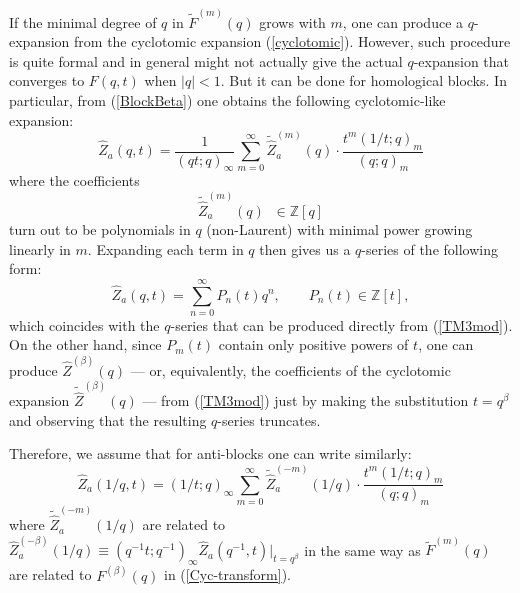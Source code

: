 \documentclass[hyper,letterpaper]{JHEP3}
\newcommand{\Z}{{\mathbb Z}}
\def\tilde{\widetilde}
\renewcommand{\hat}{\widehat}
\begin{document}
If the minimal degree of $q$ in $\tilde{F}^{(m)}(q)$ grows with $m$, one can produce a $q$-expansion from the cyclotomic expansion (\ref{cyclotomic}). However, such procedure is quite formal and in general might not actually give the actual $q$-expansion that converges to $F(q,t)$ when $|q|<1$. But it can be done for homological blocks. In particular, from (\ref{BlockBeta}) one obtains the following cyclotomic-like expansion:
\begin{equation}
	\hat{Z}_a(q,t)=\frac{1}{(qt;q)_\infty}\sum_{m=0}^\infty\tilde{\hat{Z}}_a^{(m)}(q)\cdot\frac{t^m(1/t;q)_m}{(q;q)_m}
	\label{Zcyclotomic}
\end{equation}
where the coefficients
\begin{equation}
	\tilde{\hat{Z}}_a^{(m)}(q)\;\;\in\Z[q]
\end{equation}
 turn out to be polynomials in $q$ (non-Laurent) with minimal power growing linearly in $m$. Expanding each term in $q$ then gives us a $q$-series of the following form:
\begin{equation}
	\hat{Z}_a(q,t)=\sum_{n= 0}^\infty P_n(t)q^n,\qquad P_n(t)\in \Z[t],
	\label{Block-qexp}
\end{equation}
which coincides with the $q$-series that can be produced directly from (\ref{TM3mod}).
On the other hand, since $P_m(t)$ contain only positive powers of $t$, one can produce $\hat{Z}^{(\beta)}(q)$ --- or, equivalently, the coefficients of the cyclotomic expansion $\tilde{\hat{Z}}^{(\beta)}(q)$ --- from (\ref{TM3mod}) just by making the substitution $t=q^\beta$ and observing that the resulting $q$-series truncates.

Therefore, we assume that for anti-blocks one can write similarly:
\begin{equation}
	\hat{Z}_a(1/q,t)=(1/t;q)_\infty\sum_{m=0}^\infty\tilde{\hat{Z}}_a^{(-m)}(1/q)\cdot\frac{t^m(1/t;q)_m}{(q;q)_m}
	\label{AZcyclotomic}
\end{equation}
where $\tilde{\hat{Z}}_a^{(-m)}(1/q)$ are related to ${\hat{Z}}_a^{(-\beta)}(1/q)\equiv (q^{-1}t;q^{-1})_\infty\hat{Z}_a(q^{-1},t)|_{t=q^\beta}$ in the same way as $\tilde{F}^{(m)}(q)$ are related to $F^{(\beta)}(q)$ in (\ref{Cyc-transform}).
\end{document}
